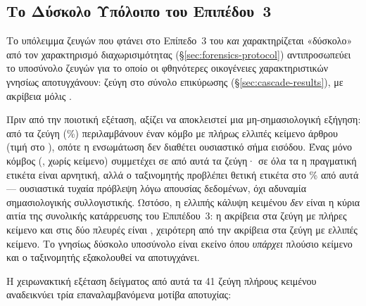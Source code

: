\subsection[Το Δύσκολο Υπόλοιπο του Επιπέδου 3]{Το Δύσκολο Υπόλοιπο του Επιπέδου~3}
\label{subsec:tier3-hard-residual}

Το υπόλειμμα ζευγών που φτάνει στο Επίπεδο~3 του  \textit{και}
χαρακτηρίζεται «δύσκολο» από τον χαρακτηρισμό διαχωρισιμότητας
(\S\ref{sec:forensics-protocol}) αντιπροσωπεύει το υποσύνολο ζευγών για το οποίο
οι φθηνότερες οικογένειες χαρακτηριστικών γνησίως αποτυγχάνουν: \HardResCount{} ζεύγη στο σύνολο
επικύρωσης (\S\ref{sec:cascade-results}), με ακρίβεια μόλις \HardResAcc{}.

Πριν από την ποιοτική εξέταση, αξίζει να αποκλειστεί μια μη-σημασιολογική εξήγηση: \HardResMissingN{}
από τα \HardResCount{} ζεύγη (\HardResMissingPct\%) περιλαμβάνουν έναν κόμβο με πλήρως ελλιπές κείμενο άρθρου
(τιμή  στο \texttt{}), οπότε η ενσωμάτωση 
δεν διαθέτει ουσιαστικό σήμα εισόδου.
Ένας μόνο κόμβος (\texttt{}, χωρίς
κείμενο) συμμετέχει σε \HardResNodePairs{} από αυτά τα ζεύγη· σε όλα τα \HardResNodePairs{} η πραγματική ετικέτα είναι
αρνητική, αλλά ο ταξινομητής προβλέπει θετική ετικέτα στο \HardResNodePredPosPct\% από αυτά ---
ουσιαστικά τυχαία πρόβλεψη λόγω απουσίας δεδομένων, όχι αδυναμία σημασιολογικής
συλλογιστικής.
Ωστόσο, η ελλιπής κάλυψη κειμένου \textit{δεν} είναι η κύρια αιτία της
συνολικής κατάρρευσης του Επιπέδου~3: η ακρίβεια στα \HardResCompleteN{} ζεύγη με πλήρες κείμενο και
στις δύο πλευρές είναι \HardResCompleteAcc{}, χειρότερη από την ακρίβεια \HardResIncompleteAcc{} στα \HardResMissingN{} ζεύγη με
ελλιπές κείμενο.
Το γνησίως δύσκολο υποσύνολο είναι εκείνο όπου \textit{υπάρχει}
πλούσιο κείμενο και ο ταξινομητής εξακολουθεί να αποτυγχάνει.

Η χειρωνακτική εξέταση δείγματος από αυτά τα 41 ζεύγη πλήρους κειμένου αναδεικνύει
τρία επαναλαμβανόμενα μοτίβα αποτυχίας:

